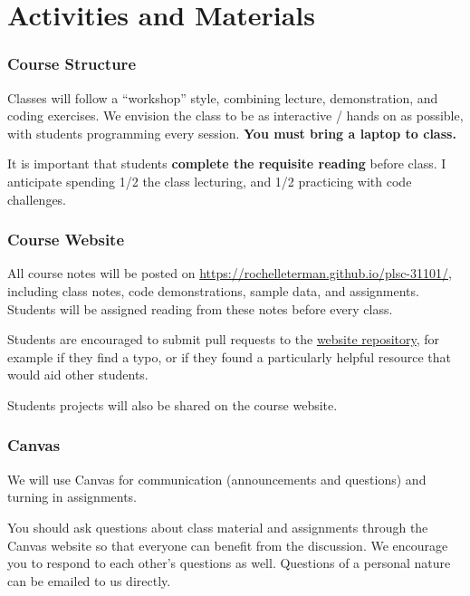 \documentclass[]{book}
\begin{document}
\section{Activities and Materials}\label{activities-and-materials}

\subsubsection*{Course Structure}\label{course-structure}

Classes will follow a ``workshop'' style, combining lecture,
demonstration, and coding exercises. We envision the class to be as
interactive / hands on as possible, with students programming every
session. \textbf{You must bring a laptop to class.}

It is important that students \textbf{complete the requisite reading}
before class. I anticipate spending 1/2 the class lecturing, and 1/2
practicing with code challenges.

\subsubsection*{Course Website}\label{course-website}

All course notes will be posted on
\url{https://rochelleterman.github.io/plsc-31101/}, including class
notes, code demonstrations, sample data, and assignments. Students will
be assigned reading from these notes before every class.

Students are encouraged to submit pull requests to the
\href{https://github.com/rochelleterman/plsc-31101}{website repository},
for example if they find a typo, or if they found a particularly helpful
resource that would aid other students.

Students projects will also be shared on the course website.

\subsubsection*{Canvas}\label{canvas}

We will use Canvas for communication (announcements and questions) and
turning in assignments.

You should ask questions about class material and assignments through
the Canvas website so that everyone can benefit from the discussion. We
encourage you to respond to each other's questions as well. Questions of
a personal nature can be emailed to us directly.
\end{document}
